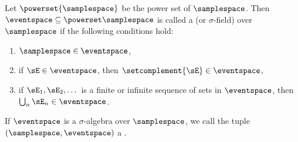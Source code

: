 \begin{definition} \label{def:sigma-algebra}
Let $\powerset{\samplespace}$ be the power set of $\samplespace$.
Then $\eventspace \subseteq \powerset\samplespace$ is called a  (or $\sigma$-field) over $\samplespace$ if the following conditions hold:
\begin{enumerate}[label=\arabic*)]
    \item $\samplespace\in\eventspace$,
    \item if $\sE\in\eventspace$, then $\setcomplement{\sE} \in \eventspace$,
    \item if $\sE_1,\sE_2,\dots$ is a finite or infinite sequence of sets in $\eventspace$, then $\bigcup_n \sE_n \in\eventspace$.
\end{enumerate}
If $\eventspace$ is a $\sigma$-algebra over $\samplespace$, we call the tuple $(\samplespace,\eventspace)$ a .
\end{definition}

